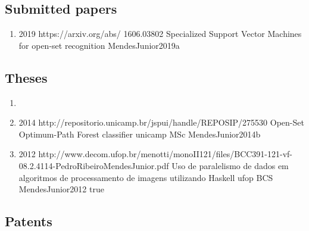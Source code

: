 \subsection*{Submitted papers}

\begin{enumerate}[resume]
\item{}
  {
  }
  {2019}
  {https://arxiv.org/abs/}
  {1606.03802}
  {Specialized Support Vector Machines for open-set recognition}
  {}
  {MendesJunior2019a}
\end{enumerate}

\subsection*{Theses}

\begin{enumerate}[resume]
\item{}
\item{}
  {2014}
  {http://repositorio.unicamp.br/jspui/handle/REPOSIP/275530}
  {Open-Set Optimum-Path Forest classifier}
  {unicamp}
  {MSc}
  {MendesJunior2014b}
  {}
\item{}
  {2012}
  {http://www.decom.ufop.br/menotti/monoII121/files/BCC391-121-vf-08.2.4114-PedroRibeiroMendesJunior.pdf}
  {Uso de paralelismo de dados em algoritmos de processamento de imagens utilizando Haskell}
  {ufop}
  {BCS}
  {MendesJunior2012}
  {true}
\end{enumerate}

\subsection*{Patents}


